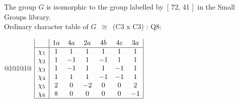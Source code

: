 \documentclass[varwidth=\maxdimen,border=10]{standalone}
\begin{document}
The group $G$ is isomorphic to the group labelled by\ [ 72, 41 ]\ in the Small Groups library.\\
Ordinary character table of $G$\ $\cong$\ (C3 x C3) : Q8:\\
\begin{center}
\begin{tabular}{@{}l@{}l@{}l@{}}
\hline
\(\begin{array}{|l|cccccc|}
  & 1a & 4a & 2a & 4b & 4c & 3a\\ \hline
\chi_{1} & 1 & 1 & 1 & 1 & 1 & 1\\
\chi_{2} & 1 & -1 & 1 & -1 & 1 & 1\\
\chi_{3} & 1 & -1 & 1 & 1 & -1 & 1\\
\chi_{4} & 1 & 1 & 1 & -1 & -1 & 1\\
\chi_{5} & 2 & 0 & -2 & 0 & 0 & 2\\
\chi_{6} & 8 & 0 & 0 & 0 & 0 & -1\\
\hline
\end{array}\)\\
\end{tabular}
\end{center}
\end{document}
